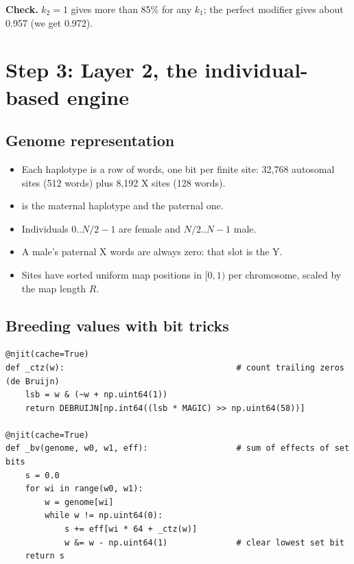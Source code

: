 \textbf{Check.} $k_2=1$ gives more than 85\% for any $k_1$; the perfect modifier gives about 0.957 (we get 0.972).

\section{Step 3: Layer 2, the individual-based engine}
\subsection{Genome representation}
\begin{itemize}
\item Each haplotype is a row of  words, one bit per finite site: 32,768 autosomal sites (512 words) plus 8,192 X sites (128 words).
\item {} is the maternal haplotype and  the paternal one.
\item Individuals $0..N/2-1$ are female and $N/2..N-1$ male.
\item A male's paternal X words are always zero: that slot is the Y.
\item Sites have sorted uniform map positions in $[0,1)$ per chromosome, scaled by the map length $R$.
\end{itemize}

\subsection{Breeding values with bit tricks}
\begin{lstlisting}
@njit(cache=True)
def _ctz(w):                                   # count trailing zeros (de Bruijn)
    lsb = w & (~w + np.uint64(1))
    return DEBRUIJN[np.int64((lsb * MAGIC) >> np.uint64(58))]

@njit(cache=True)
def _bv(genome, w0, w1, eff):                  # sum of effects of set bits
    s = 0.0
    for wi in range(w0, w1):
        w = genome[wi]
        while w != np.uint64(0):
            s += eff[wi * 64 + _ctz(w)]
            w &= w - np.uint64(1)              # clear lowest set bit
    return s
\end{lstlisting}


